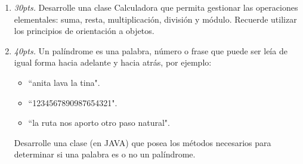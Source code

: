 \documentclass[10pt]{article}
\begin{document}
{\begin{enumerate}
\begin{multicols}{2}
\end{multicols}

\newpage

\item \emph{30pts.} Desarrolle una clase Calculadora que permita gestionar las operaciones elementales: suma, resta, multiplicaci\'on, divisi\'on y m\'odulo. Recuerde utilizar los principios de orientaci\'on a objetos.

\newpage

\item \emph{40pts.} Un pal\'indrome es una palabra, n\'umero o frase que puede ser le\'ia de igual forma hacia adelante y hacia atr\'as, por ejemplo:
		\begin{itemize}
			\item[] ``anita lava la tina".
			\item[] ``1234567890987654321".
			\item[] ``la ruta nos aporto otro paso natural".
		\end{itemize}
Desarrolle una clase (en JAVA) que posea los m\'etodos necesarios para determinar si una palabra es o no un pal\'indrome.
\end{enumerate}
}
\end{document}
